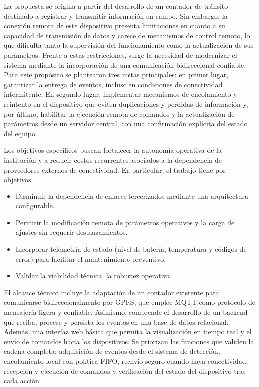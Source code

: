 La propuesta se origina a partir del desarrollo de un contador de tránsito destinado a registrar y transmitir información en campo. Sin embargo, la conexión remota de este dispositivo presenta limitaciones en cuanto a su capacidad de transmisión de datos y carece de mecanismos de control remoto, lo que dificulta tanto la supervisión del funcionamiento como la actualización de sus parámetros. Frente a estas restricciones, surge la necesidad de modernizar el sistema mediante la incorporación de una comunicación bidireccional confiable. Para este propósito se plantearon tres metas principales: en primer lugar, garantizar la entrega de eventos, incluso en condiciones de conectividad intermitente. En segundo lugar, implementar mecanismos de encolamiento y reintento en el dispositivo que eviten duplicaciones y pérdidas de información y, por último, habilitar la ejecución remota de comandos y la actualización de parámetros desde un servidor central, con una confirmación explícita del estado del equipo.

Los objetivos específicos buscan fortalecer la autonomía operativa de la institución y a reducir costos recurrentes asociados a la dependencia de proveedores externos de conectividad. En particular, el trabajo tiene por objetivos:
\begin{itemize}
\item Disminuir la dependencia de enlaces tercerizados mediante una arquitectura configurable.

\item Permitir la modificación remota de parámetros operativos y la carga de ajustes sin requerir desplazamientos. 

\item Incorporar telemetría de estado (nivel de batería, temperatura y códigos de error) para facilitar el mantenimiento preventivo.

\item Validar la viabilidad técnica, la robustez operativa.
\end{itemize}

El alcance técnico incluye la adaptación de un contador existente para comunicarse bidireccionalmente por GPRS, que emplee MQTT como protocolo de mensajería ligera y confiable. Asimismo, comprende el desarrollo de un backend que reciba, procese y persista los eventos en una base de datos relacional. Además, una interfaz web básica que permita la visualización en tiempo real y el envío de comandos hacia los dispositivos. Se priorizan las funciones que validen la cadena completa: adquisición de eventos desde el sistema de detección, encolamiento local con política FIFO, reenvío seguro cuando haya conectividad, recepción y ejecución de comandos y verificación del estado del dispositivo tras cada acción.

